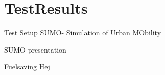 

\section{TestResults}
\begin{frame}{Test Setup}
SUMO- Simulation of Urban MObility
\end{frame}

\begin{frame}{SUMO presentation}
\end{frame}

\begin{frame}{Fuelsaving}
Hej
\end{frame}